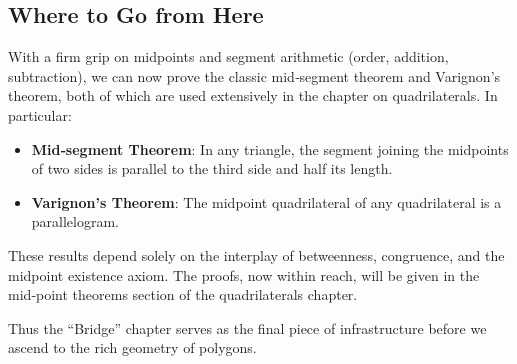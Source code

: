 \documentclass[12pt, letterpaper]{article}
\theoremstyle{definition}
\begin{document}
\subsection{Where to Go from Here}
With a firm grip on midpoints and segment arithmetic (order, addition, subtraction), we can now prove the classic mid‑segment theorem and Varignon’s theorem, both of which are used extensively in the chapter on quadrilaterals. In particular:

\begin{itemize}
  \item \textbf{Mid‑segment Theorem}: In any triangle, the segment joining the midpoints of two sides is parallel to the third side and half its length.
  \item \textbf{Varignon’s Theorem}: The midpoint quadrilateral of any quadrilateral is a parallelogram.
\end{itemize}

These results depend solely on the interplay of betweenness, congruence, and the midpoint existence axiom. The proofs, now within reach, will be given in the mid‑point theorems section of the quadrilaterals chapter.

Thus the “Bridge” chapter serves as the final piece of infrastructure before we ascend to the rich geometry of polygons.
\end{document}
